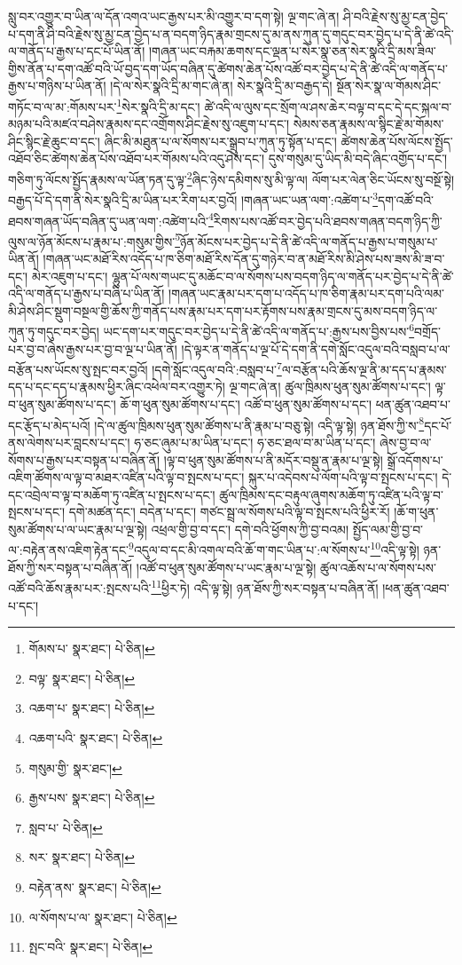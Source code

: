 སླུ་བར་འགྱུར་བ་ཡིན་ལ་དོན་འགའ་ཡང་རྒྱས་པར་མི་འགྱུར་བ་དག་སྟེ། ལྔ་གང་ཞེ་ན། ཤི་བའི་རྗེས་སུ་མྱ་ངན་བྱེད་པ་དག་ནི་ཤི་བའི་རྗེས་སུ་མྱ་ངན་བྱེད་པ་ན་བདག་ཉིད་རྣམ་གྲངས་དུ་མ་ནས་ཀུན་དུ་གདུང་བར་བྱེད་པ་དེ་ནི་ཚེ་འདི་ལ་གནོད་པ་རྒྱས་པ་དང་པོ་ཡིན་ནོ། །གཞན་ཡང་བརྐམ་ཆགས་དང་ལྡན་པ་སེར་སྣ་ཅན་སེར་སྣའི་དྲི་མས་ཟིལ་གྱིས་ནོན་པ་དག་འཚོ་བའི་ཡོ་བྱད་དག་ཡོད་བཞིན་དུ་ཚེགས་ཆེན་པོས་འཚོ་བར་བྱེད་པ་དེ་ནི་ཚེ་འདི་ལ་གནོད་པ་རྒྱས་པ་གཉིས་པ་ཡིན་ནོ། །དེ་ལ་སེར་སྣའི་དྲི་མ་གང་ཞེ་ན། སེར་སྣའི་དྲི་མ་བརྒྱད་དེ། སྔོན་སེར་སྣ་ལ་གོམས་ཤིང་གཏོང་བ་ལ་མ་:གོམས་པར་\footnote{གོམས་པ་  སྣར་ཐང་།  པེ་ཅིན། }སེར་སྣའི་དྲི་མ་དང་། ཚེ་འདི་ལ་ལུས་དང་སྲོག་ལ་ཤས་ཆེར་བལྟ་བ་དང་དེ་དང་སྐལ་བ་མཉམ་པའི་མཛའ་བཤེས་རྣམས་དང་འགྲོགས་ཤིང་རྗེས་སུ་འཇུག་པ་དང་། སེམས་ཅན་རྣམས་ལ་སྙིང་རྗེ་མ་གོམས་ཤིང་སྙིང་རྗེ་ཆུང་བ་དང་། ཞིང་མི་མཐུན་པ་ལ་སོགས་པར་སྒྲུབ་པ་ཀུན་ཏུ་སྟོན་པ་དང་། ཚེགས་ཆེན་པོས་ལོངས་སྤྱོད་འཐོབ་ཅིང་ཚེགས་ཆེན་པོས་འཐོབ་པར་གོམས་པའི་འདུ་ཤེས་དང་། དུས་གསུམ་དུ་ཡིད་མི་བདེ་ཞིང་འགྱོད་པ་དང་། གཅིག་ཏུ་ལོངས་སྤྱོད་རྣམས་ལ་ཡོན་ཏན་དུ་ལྟ་\footnote{བལྟ་  སྣར་ཐང་།  པེ་ཅིན། }ཞིང་ཉེས་དམིགས་སུ་མི་ལྟ་ལ། ལོག་པར་ལེན་ཅིང་ཡོངས་སུ་བསྔོ་སྟེ། བརྒྱད་པོ་དེ་དག་ནི་སེར་སྣའི་དྲི་མ་ཡིན་པར་རིག་པར་བྱའོ། །གཞན་ཡང་ཡན་ལག་:འཚེག་པ་\footnote{འཆག་པ་  སྣར་ཐང་།  པེ་ཅིན། }དག་འཚོ་བའི་ཐབས་གཞན་ཡོད་བཞིན་དུ་ཡན་ལག་:འཚེག་པའི་\footnote{འཆག་པའི་  སྣར་ཐང་།  པེ་ཅིན། }རིགས་པས་འཚོ་བར་བྱེད་པའི་ཐབས་གཞན་བདག་ཉིད་ཀྱི་ལུས་ལ་ཉོན་མོངས་པ་རྣམ་པ་:གསུམ་གྱིས་\footnote{གསུམ་གྱི་  སྣར་ཐང་། }ཉོན་མོངས་པར་བྱེད་པ་དེ་ནི་ཚེ་འདི་ལ་གནོད་པ་རྒྱས་པ་གསུམ་པ་ཡིན་ནོ། །གཞན་ཡང་མཐོ་རིས་འདོད་པ་ཁ་ཅིག་མཐོ་རིས་དོན་དུ་གཉེར་བ་ན་མཐོ་རིས་མི་ཤེས་པས་ཟས་མི་ཟ་བ་དང་། མེར་འཇུག་པ་དང་། ལྷུན་པོ་ལས་གཡང་དུ་མཆོང་བ་ལ་སོགས་པས་བདག་ཉིད་ལ་གནོད་པར་བྱེད་པ་དེ་ནི་ཚེ་འདི་ལ་གནོད་པ་རྒྱས་པ་བཞི་པ་ཡིན་ནོ། །གཞན་ཡང་རྣམ་པར་དག་པ་འདོད་པ་ཁ་ཅིག་རྣམ་པར་དག་པའི་ལམ་མི་ཤེས་ཤིང་སྡུག་བསྔལ་གྱི་ཆོས་ཀྱི་གནོད་པས་རྣམ་པར་དག་པར་རྟོགས་པས་རྣམ་གྲངས་དུ་མས་བདག་ཉིད་ལ་ཀུན་ཏུ་གདུང་བར་བྱེད། ཡང་དག་པར་གདུང་བར་བྱེད་པ་དེ་ནི་ཚེ་འདི་ལ་གནོད་པ་:རྒྱས་པས་བྱིས་པས་\footnote{རྒྱས་པས་  སྣར་ཐང་།  པེ་ཅིན། }བགྲོད་པར་བྱ་བ་ཞེས་རྒྱས་པར་བྱ་བ་ལྔ་པ་ཡིན་ནོ། །དེ་ལྟར་ན་གནོད་པ་ལྔ་པོ་དེ་དག་ནི་དགེ་སློང་འདུལ་བའི་བསླབ་པ་ལ་བརྩོན་པས་ཡོངས་སུ་སྤང་བར་བྱའོ། །དགེ་སློང་འདུལ་བའི་:བསླབ་པ་\footnote{སླབ་པ་  པེ་ཅིན། }ལ་བརྩོན་པའི་ཆོས་ལྔ་ནི་མ་དད་པ་རྣམས་དད་པ་དང་དད་པ་རྣམས་ཕྱིར་ཞིང་འཕེལ་བར་འགྱུར་ཏེ། ལྔ་གང་ཞེ་ན། ཚུལ་ཁྲིམས་ཕུན་སུམ་ཚོགས་པ་དང་། ལྟ་བ་ཕུན་སུམ་ཚོགས་པ་དང་། ཆོ་ག་ཕུན་སུམ་ཚོགས་པ་དང་། འཚོ་བ་ཕུན་སུམ་ཚོགས་པ་དང་། ཕན་ཚུན་འཐབ་པ་དང་རྩོད་པ་མེད་པའོ། །དེ་ལ་ཚུལ་ཁྲིམས་ཕུན་སུམ་ཚོགས་པ་ནི་རྣམ་པ་བཅུ་སྟེ། འདི་ལྟ་སྟེ། ཉན་ཐོས་ཀྱི་ས་\footnote{སར་  སྣར་ཐང་།  པེ་ཅིན། }དང་པོ་ནས་ལེགས་པར་བླངས་པ་དང་། ཧ་ཅང་ཞུམ་པ་མ་ཡིན་པ་དང་། ཧ་ཅང་ཐལ་བ་མ་ཡིན་པ་དང་། ཞེས་བྱ་བ་ལ་སོགས་པ་རྒྱས་པར་བསྟན་པ་བཞིན་ནོ། །ལྟ་བ་ཕུན་སུམ་ཚོགས་པ་ནི་མདོར་བསྡུ་ན་རྣམ་པ་ལྔ་སྟེ། སྒྲོ་འདོགས་པ་འཇིག་ཚོགས་ལ་ལྟ་བ་མཐར་འཛིན་པའི་ལྟ་བ་སྤངས་པ་དང་། སྐུར་པ་འདེབས་པ་ལོག་པའི་ལྟ་བ་སྤངས་པ་དང་། དེ་དང་འབྲེལ་བ་ལྟ་བ་མཆོག་ཏུ་འཛིན་པ་སྤངས་པ་དང་། ཚུལ་ཁྲིམས་དང་བརྟུལ་ཞུགས་མཆོག་ཏུ་འཛིན་པའི་ལྟ་བ་སྤངས་པ་དང་། དགེ་མཚན་དང་། བདེན་པ་དང་། གཙང་སྦྲ་ལ་སོགས་པའི་ལྟ་བ་སྤངས་པའི་ཕྱིར་རོ། །ཆོ་ག་ཕུན་སུམ་ཚོགས་པ་ལ་ཡང་རྣམ་པ་ལྔ་སྟེ། འཕྲལ་གྱི་བྱ་བ་དང་། དགེ་བའི་ཕྱོགས་ཀྱི་བྱ་བའམ། སྤྱོད་ལམ་གྱི་བྱ་བ་ལ་:བརྟེན་ནས་འཇིག་རྟེན་དང་\footnote{བརྟེན་ནས་  སྣར་ཐང་།  པེ་ཅིན། }འདུལ་བ་དང་མི་འགལ་བའི་ཆོ་ག་གང་ཡིན་པ་:ལ་སོགས་པ་\footnote{ལ་སོགས་པ་ལ་  སྣར་ཐང་།  པེ་ཅིན། }འདི་ལྟ་སྟེ། ཉན་ཐོས་ཀྱི་སར་བསྟན་པ་བཞིན་ནོ། །འཚོ་བ་ཕུན་སུམ་ཚོགས་པ་ཡང་རྣམ་པ་ལྔ་སྟེ། ཚུལ་འཆོས་པ་ལ་སོགས་པས་འཚོ་བའི་ཆོས་རྣམ་པར་:སྤངས་པའི་\footnote{སྤང་བའི་  སྣར་ཐང་།  པེ་ཅིན། }ཕྱིར་ཏེ། འདི་ལྟ་སྟེ། ཉན་ཐོས་ཀྱི་སར་བསྟན་པ་བཞིན་ནོ། །ཕན་ཚུན་འཐབ་པ་དང་། 